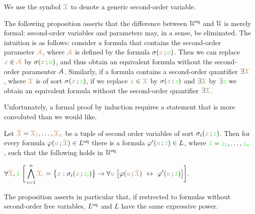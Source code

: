 \documentclass[creche.tex]{subfiles}
\begin{document}
We use the symbol ${\color{brown}\EuScript X}$ to denote a generic second-order variable.



The following proposition asserts that the difference between $\EuScript U^{{\rm eq}}$ and $\EuScript U$ is merely formal: second-order variables and parameters may, in a sense, be eliminated.
The intuition is as follows: consider a formula that contains the second-order parameter ${\color{brown}{\EuScript A}}$, where ${\color{brown}{\EuScript A}}$ is defined by the formula $\sigma({\color{brown} x}\,; {\color{green} a})$. Then we can replace ${\color{brown} x}\in{\color{brown}{\EuScript A}}$ by $\sigma({\color{brown} x}\,; {\color{green} a})$, and thus obtain an equivalent formula without the second-order paramenter $\EuScript A$.
Similarly, if a formula contains a second-order quantifier $\exists{\color{brown}\EuScript X}$, where ${\color{brown}\EuScript X}$ is of sort $\sigma({\color{brown} x}\,; {\color{green} z})$, if we replace ${\color{brown} x}\in{\color{brown}\EuScript X}$ by $\sigma({\color{brown} x}\,; {\color{green} z})$ and $\exists{\color{brown}\EuScript X}$ by $\exists{\color{green}z}$ we obtain an equivalent formula without the second-order quantifier $\exists{\color{brown}\EuScript X}$.

Unfortunately, a formal proof by induction requires a statement that is more convoluted than we would like.

\begin{proposition}\label{prop_eqmild}
Let ${\color{brown}\bar{\EuScript X}}={\color{brown}\EuScript X_1},\dots,{\color{brown}\EuScript X_n}$ be a tuple of second order variables of sort $\sigma_i({\color{brown} x}\,;{\color{green} z})$.
Then for every formula $\varphi({\color{brown} u}\,;{\color{brown}\bar {\EuScript X}})\in L^{{\rm eq}}$ there is a formula $\varphi'({\color{brown} u}\,;{\color{green}\bar z})\in L$, where ${\color{green}\bar z}={\color{green} z_1},\dots,{\color{green} z_n}$, such that the following holds in $\EuScript U^{{\rm eq}}$

\hfil$\displaystyle\A {\vl\bar\X},{\gr\bar z}\ \bigg[\bigwedge^n_{i=1}{\vl\X_i}=\big\{{\mr x}:\sigma_i({\mr x}\,;{\gr z_i})\big\}\imp\A {\mr u}\ \big[\phi({\mr u}\,;{\vl\bar\X})\ \iff\ \phi'({\mr u}\,;{\gr\bar z})\big]\bigg].$

\end{proposition}

The proposition asserts in particular that, if restrected to formulas without second-order free variables, $L^{{\rm eq}}$ and $L$ have the same expressive power.
\end{document}
